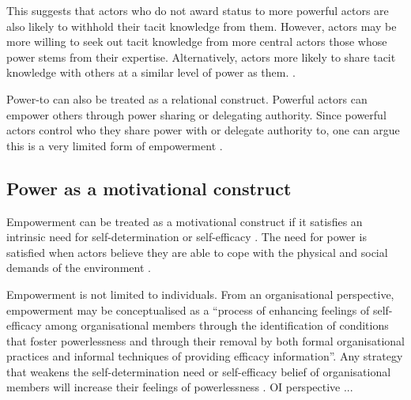 This suggests that actors who do not award status to more powerful actors are also likely to withhold their tacit knowledge from them. However, actors may be more willing to seek out tacit knowledge from more central actors those whose power stems from their expertise. Alternatively, actors more likely to share tacit knowledge with others at a similar level of power as them. \medskip.

Power-to can also be treated as a relational construct. Powerful actors can empower others through power sharing or delegating authority. Since powerful actors control who they share power with or delegate authority to, one can argue this is a very limited form of empowerment \citep{conger1988empowerment}. \medskip



\subsection{Power as a motivational construct}

 Empowerment can be treated as a motivational construct if it satisfies an intrinsic need for self-determination or self-efficacy \citep{deci1989self,bandura1986social}. The need for power is satisfied when actors believe they are able to cope with the physical and social demands of the environment \citep{conger1988empowerment}. \medskip

Empowerment is not limited to individuals. From an organisational perspective, empowerment may be conceptualised as a \enquote{process of enhancing feelings of self-efficacy among organisational members through the identification of conditions that foster powerlessness and through their removal by both formal organisational practices and informal techniques of providing efficacy information}. Any strategy that weakens the self-determination need or self-efficacy belief of organisational members will increase their feelings of powerlessness \citep{conger1988empowerment}. OI perspective ... \medskip

